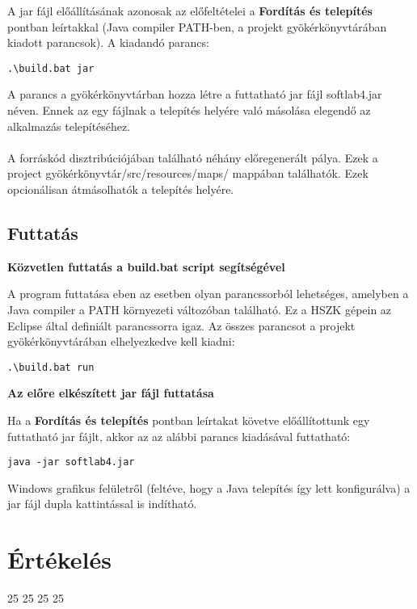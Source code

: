 \noindent A jar fájl előállításának azonosak az előfeltételei a \textbf{Fordítás és telepítés} pontban leírtakkal (Java compiler PATH-ben, a projekt gyökérkönyvtárában kiadott parancsok). A kiadandó parancs:
\lstset{escapeinside=`', xleftmargin=10pt, frame=single, basicstyle=\ttfamily\footnotesize, language=sh}
\begin{lstlisting}
.\build.bat jar
\end{lstlisting}
\noindent A parancs a gyökérkönyvtárban hozza létre a futtatható jar fájl softlab4.jar néven. Ennek az egy fájlnak a telepítés helyére való másolása elegendő az alkalmazás telepítéséhez. 
\\\\
\noindent A forráskód disztribúciójában található néhány előregenerált pálya. Ezek a {project gyökérkönyvtár}/src/resources/maps/ mappában találhatók. Ezek opcionálisan átmásolhatók a telepítés helyére.

\subsection{Futtatás}
\noindent \textbf{Közvetlen futtatás a build.bat script segítségével}

\noindent A program futtatása eben az esetben olyan parancssorból lehetséges, amelyben a Java compiler a PATH környezeti változóban található. Ez a HSZK gépein az Eclipse által definiált parancssorra igaz. Az összes parancsot a projekt gyökérkönyvtárában elhelyezkedve kell kiadni:
\lstset{escapeinside=`', xleftmargin=10pt, frame=single, basicstyle=\ttfamily\footnotesize, language=sh}
\begin{lstlisting}
.\build.bat run
\end{lstlisting}

\noindent \textbf{Az előre elkészített jar fájl futtatása}

\noindent Ha a \textbf{Fordítás és telepítés} pontban leírtakat követve előállítottunk egy futtatható jar fájlt, akkor az az alábbi parancs kiadásával futtatható:
\lstset{escapeinside=`', xleftmargin=10pt, frame=single, basicstyle=\ttfamily\footnotesize, language=sh}
\begin{lstlisting}
java -jar softlab4.jar
\end{lstlisting}

\noindent Windows grafikus felületről (feltéve, hogy a Java telepítés így lett konfigurálva) a jar fájl dupla kattintással is indítható.

\section{Értékelés}
\begin{ertekeles}
{25}        %
{25}
{25}
{25}
\end{ertekeles}

